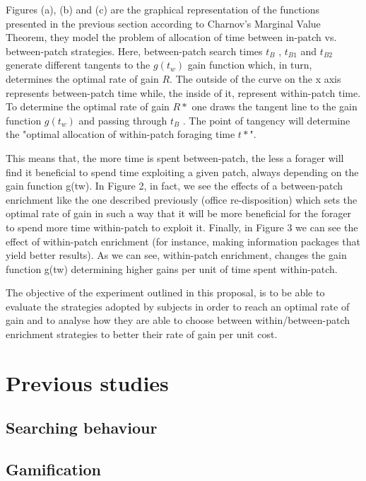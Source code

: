 \documentclass{mproj}
\begin{document}
Figures (a), (b) and (c) are the graphical representation of the functions presented in the previous section according to Charnov's Marginal Value Theorem, they model the problem of allocation of time between in-patch vs. between-patch strategies. Here, between-patch search times $t_B$ , $t_{B1}$ and $t_{B2}$ generate different tangents to the $g(t_w)$ gain function which, in turn, determines the optimal rate of gain $R$. The outside of the curve on the x axis represents between-patch time while, the inside of it, represent within-patch time. To determine the optimal rate of gain $R*$ one draws the tangent line to the gain function $g(t_w)$ and passing through $t_B$ . The point of tangency will determine the "optimal allocation of within-patch foraging time $t*$".  

This means that, the more time is spent between-patch, the less a forager will find it beneficial to spend time exploiting a given patch, always depending on the gain function g(tw). In Figure 2, in fact, we see the effects of a between-patch enrichment like the one described previously (office re-disposition) which sets the optimal rate of gain in such a way that it will be more beneficial for the forager to spend more time within-patch to exploit it. Finally, in Figure 3 we can see the effect of within-patch enrichment (for instance, making information packages that yield better results). As we can see, within-patch enrichment, changes the gain function g(tw) determining higher gains per unit of time spent within-patch.

The objective of the experiment outlined in this proposal, is to be able to evaluate the strategies adopted by subjects in order to reach an optimal rate of gain and to analyse how they are able to choose between within/between-patch enrichment strategies to better their rate of gain per unit cost. 


\section{Previous studies}
\subsection{Searching behaviour}
\subsection{Gamification}

\end{document}
